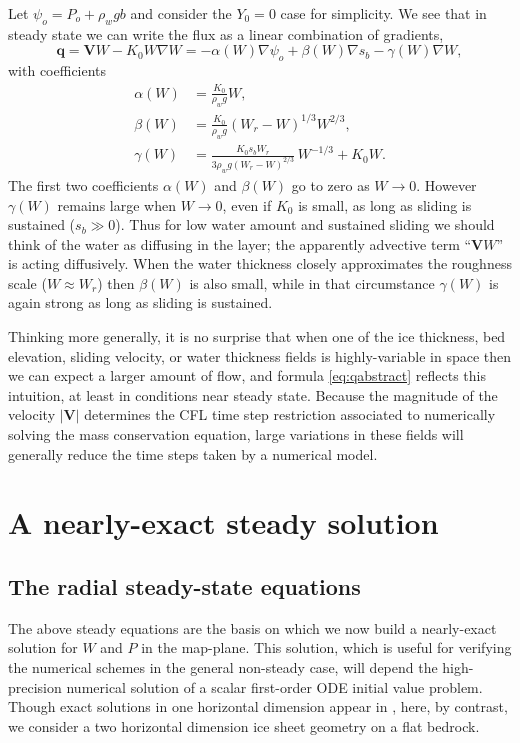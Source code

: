 \documentclass[11pt,final]{amsart}%
\newcommand\bV{\mathbf{V}}
\newcommand\bq{\mathbf{q}}
\newcommand{\grad}{\nabla}
\begin{document}
Let $\psi_o = P_o + \rho_w g b$ and consider the $Y_0=0$ case for simplicity.  We see that in steady state we can write the flux as a linear combination of gradients,
\begin{equation}
\bq = \bV W - K_0 W \grad W = - \alpha(W) \grad \psi_o + \beta(W) \grad s_b - \gamma(W) \grad W,  \label{eq:qabstract}
\end{equation}
with coefficients
\begin{align*}
\alpha(W) &= \frac{K_0}{\rho_w g} W, \\
\beta(W) &= \frac{K_0}{\rho_w g} \left(W_r - W\right)^{1/3} W^{2/3}, \\
\gamma(W) &= \frac{K_0 s_b W_r}{3 \rho_w g (W_r - W)^{2/3}}\, W^{-1/3} + K_0 W.
\end{align*}
The first two coefficients $\alpha(W)$ and $\beta(W)$ go to zero as $W\to 0$.  However $\gamma(W)$ remains large when $W\to 0$, even if $K_0$ is small, as long as sliding is sustained ($s_b \gg 0$).  Thus for low water amount and sustained sliding we should think of the water as diffusing in the layer; the apparently advective term ``$\bV W$'' is acting diffusively.  When the water thickness closely approximates the roughness scale ($W\approx W_r$) then $\beta(W)$ is also small, while in that circumstance $\gamma(W)$ is again strong as long as sliding is sustained.

Thinking more generally, it is no surprise that when one of the ice thickness, bed elevation, sliding velocity, or water thickness fields is highly-variable in space then we can expect a larger amount of flow, and formula \eqref{eq:qabstract} reflects this intuition, at least in conditions near steady state.  Because the magnitude of the velocity $|\bV|$ determines the CFL time step restriction \citep{MortonMayers} associated to numerically solving the mass conservation equation, large variations in these fields will generally reduce the time steps taken by a numerical model.



\section{A nearly-exact steady solution}

\subsection*{The radial steady-state equations}  The above steady equations are the basis on which we now build a nearly-exact solution for $W$ and $P$ in the map-plane.  This solution, which is useful for verifying the numerical schemes in the general non-steady case, will depend the high-precision numerical solution of a scalar first-order ODE initial value problem.  Though exact solutions in one horizontal dimension appear in \cite{Schoofetal2012}, here, by contrast, we consider a two horizontal dimension ice sheet geometry on a flat bedrock.
\end{document}
